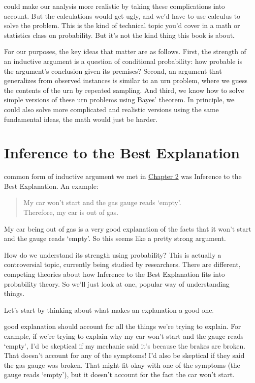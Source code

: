 \documentclass[justified]{tufte-book}
\newenvironment{argument}{\begin{quote}\normalsize}{\end{quote}}
\theoremstyle{definition}
\theoremstyle{definition}
\theoremstyle{definition}
\theoremstyle{remark}
\begin{document}
 could make our analysis more realistic by taking these
complications into account. But the calculations would get ugly, and
we'd have to use calculus to solve the problem. This is the kind of
technical topic you'd cover in a math or statistics class on
probability. But it's not the kind thing this book is about.

For our purposes, the key ideas that matter are as follows. First, the
strength of an inductive argument is a question of conditional
probability: how probable is the argument's conclusion given its
premises? Second, an argument that generalizes from observed instances
is similar to an urn problem, where we guess the contents of the urn by
repeated sampling. And third, we know how to solve simple versions of
these urn problems using Bayes' theorem. In principle, we could also
solve more complicated and realistic versions using the same fundamental
ideas, the math would just be harder.

\hypertarget{bayesibe}{%
\section{Inference to the Best Explanation}\label{bayesibe}}

 common form of inductive argument we met in
\protect\hyperlink{logic}{Chapter 2} was Inference to the Best
Explanation. An example:

\begin{argument}
My car won't start and the gas gauge reads `empty'.\\
Therefore, my car is out of gas.
\end{argument}

My car being out of gas is a very good explanation of the facts that it
won't start and the gauge reads `empty'. So this seems like a pretty
strong argument.

How do we understand its strength using probability? This is actually a
controversial topic, currently being studied by researchers. There are
different, competing theories about how Inference to the Best
Explanation fits into probability theory. So we'll just look at one,
popular way of understanding things.

Let's start by thinking about what makes an explanation a good one.

 good explanation should account for all the things we're
trying to explain. For example, if we're trying to explain why my car
won't start and the gauge reads `empty', I'd be skeptical if my mechanic
said it's because the brakes are broken. That doesn't account for any of
the symptoms! I'd also be skeptical if they said the gas gauge was
broken. That might fit okay with one of the symptoms (the gauge reads
`empty'), but it doesn't account for the fact the car won't start.
\end{document}
